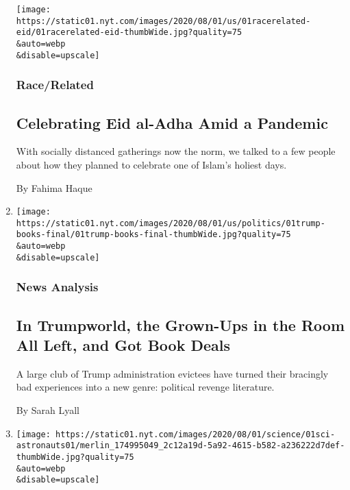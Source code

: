 \begin{enumerate}
  \texttt{[image: https://static01.nyt.com/images/2020/08/01/us/01racerelated-eid/01racerelated-eid-thumbWide.jpg?quality=75\\\&auto=webp\\\&disable=upscale]}

  \hypertarget{racerelated}{%
  \subsubsection{Race/Related}\label{racerelated}}

  \hypertarget{celebrating-eid-al-adha-amid-a-pandemic}{%
  \subsection{Celebrating Eid al-Adha Amid a
  Pandemic}\label{celebrating-eid-al-adha-amid-a-pandemic}}

  With socially distanced gatherings now the norm, we talked to a few
  people about how they planned to celebrate one of Islam's holiest
  days.

  By Fahima Haque
\item
  \href{/2020/08/01/us/politics/trump-books.html}{}

  \texttt{[image: https://static01.nyt.com/images/2020/08/01/us/politics/01trump-books-final/01trump-books-final-thumbWide.jpg?quality=75\\\&auto=webp\\\&disable=upscale]}

  \hypertarget{news-analysis}{%
  \subsubsection{News Analysis}\label{news-analysis}}

  \hypertarget{in-trumpworld-the-grown-ups-in-the-room-all-left-and-got-book-deals}{%
  \subsection{In Trumpworld, the Grown-Ups in the Room All Left, and Got
  Book
  Deals}\label{in-trumpworld-the-grown-ups-in-the-room-all-left-and-got-book-deals}}

  A large club of Trump administration evictees have turned their
  bracingly bad experiences into a new genre: political revenge
  literature.

  By Sarah Lyall
\item
  \href{/2020/08/01/science/nasa-spacex-astronauts.html}{}

  \texttt{[image: https://static01.nyt.com/images/2020/08/01/science/01sci-astronauts01/merlin\_174995049\_2c12a19d-5a92-4615-b582-a236222d7def-thumbWide.jpg?quality=75\\\&auto=webp\\\&disable=upscale]}


\end{enumerate}
